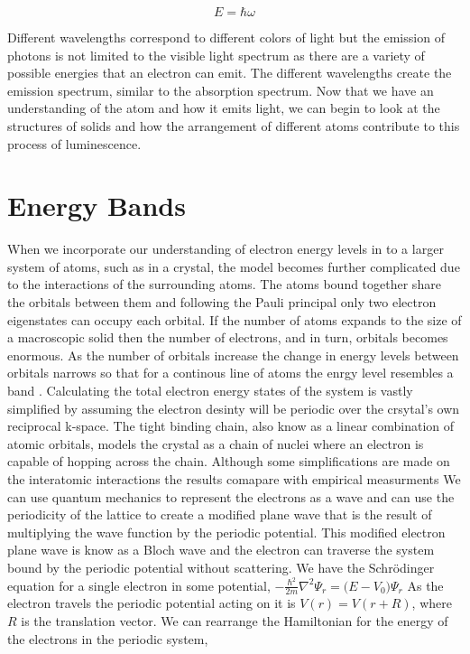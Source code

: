 \documentclass[prl,onecolumn]{revtex4-1}  %
\begin{document}
\begin{equation}
E = \hbar \omega
\end{equation}

Different wavelengths correspond to different colors of light but the emission of photons is not limited to the visible light spectrum as there are a variety of possible energies that an electron can emit. The different wavelengths create the emission spectrum, similar to the absorption spectrum. Now that we have an understanding of the atom and how it emits light, we can begin to look at the structures of solids and how the arrangement of different atoms contribute to this process of luminescence.


\section{Energy Bands}
When we incorporate our understanding of electron energy levels in to a larger system of atoms, such as in a crystal, the model becomes further complicated due to the interactions of the surrounding atoms. The atoms bound together share the orbitals between them and following the Pauli principal only two electron eigenstates can occupy each orbital. If the number of atoms expands to the size of a macroscopic solid then the number of electrons, and in turn, orbitals becomes enormous. As the number of orbitals increase the change in energy levels between orbitals narrows so that for a continous line of atoms the enrgy level resembles a band  \cite{Levitin}. Calculating the total electron energy states of the system is vastly simplified by assuming the electron desinty will be periodic over the crsytal's own reciprocal k-space\cite{Lou}. The tight binding chain, also know as a linear combination of atomic orbitals, models the crystal as a chain of nuclei where an electron is capable of hopping across the chain. Although some simplifications are made on the interatomic interactions the results comapare with empirical measurments \cite{Elsevier}  We can use quantum mechanics to represent the electrons as a wave and can use the periodicity of the lattice to create a modified plane wave that is the result of multiplying the wave function by the periodic potential. This modified electron plane wave is know as a Bloch wave and the electron can traverse the system bound by the periodic potential without scattering\cite{Elsevier}. 
We have the Schr\"odinger equation for a single electron in some potential,
$
-\frac{\hbar^2}{2m} \nabla^2 \Psi_r = \big (E-V_0 \big) \Psi_r  
$
As the electron travels the periodic potential acting on it is   $V(r) = V(r+R)$, where $R$ is the translation vector. We can rearrange the Hamiltonian for the energy of the electrons in the periodic system,
\end{document}
